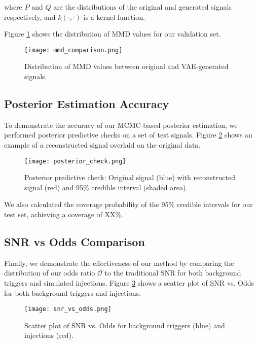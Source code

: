 \documentclass[twocolumn]{aastex631}
\begin{document}
where $P$ and $Q$ are the distributions of the original and generated signals respectively, and $k(\cdot,\cdot)$ is a kernel function.

Figure \ref{fig:mmd_comparison} shows the distribution of MMD values for our validation set.

\begin{figure}[h]
    \centering
    \texttt{[image: mmd\_comparison.png]}
    \caption{Distribution of MMD values between original and VAE-generated signals.}
    \label{fig:mmd_comparison}
\end{figure}

\subsection{Posterior Estimation Accuracy}
To demonstrate the accuracy of our MCMC-based posterior estimation, we performed posterior predictive checks on a set of test signals. 
Figure \ref{fig:posterior_check} shows an example of a reconstructed signal overlaid on the original data.

\begin{figure}[h]
    \centering
    \texttt{[image: posterior\_check.png]}
    \caption{Posterior predictive check: Original signal (blue) with reconstructed signal (red) and 95\% credible interval (shaded area).}
    \label{fig:posterior_check}
\end{figure}

We also calculated the coverage probability of the 95\% credible intervals for our test set, achieving a coverage of XX\%.

\subsection{SNR vs Odds Comparison}


Finally, we demonstrate the effectiveness of our method by comparing the distribution of our odds ratio $\mathcal{O}$ to the traditional SNR for both background triggers and simulated injections. 
Figure \ref{fig:snr_vs_odds} shows a scatter plot of SNR vs. Odds for both background triggers and injections.

\begin{figure}[h]
    \centering
    \texttt{[image: snr\_vs\_odds.png]}
    \caption{Scatter plot of SNR vs. Odds for background triggers (blue) and injections (red).}
    \label{fig:snr_vs_odds}
\end{figure}
\end{document}
